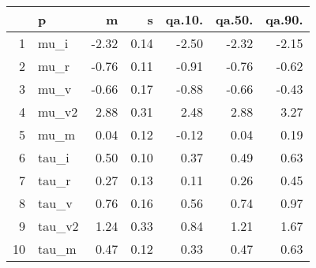 \begin{table}[ht]
\centering
\begin{tabular}{rlrrrrr}
  \hline
 & p & m & s & qa.10. & qa.50. & qa.90. \\ 
  \hline
1 & mu\_i & -2.32 & 0.14 & -2.50 & -2.32 & -2.15 \\ 
  2 & mu\_r & -0.76 & 0.11 & -0.91 & -0.76 & -0.62 \\ 
  3 & mu\_v & -0.66 & 0.17 & -0.88 & -0.66 & -0.43 \\ 
  4 & mu\_v2 & 2.88 & 0.31 & 2.48 & 2.88 & 3.27 \\ 
  5 & mu\_m & 0.04 & 0.12 & -0.12 & 0.04 & 0.19 \\ 
  6 & tau\_i & 0.50 & 0.10 & 0.37 & 0.49 & 0.63 \\ 
  7 & tau\_r & 0.27 & 0.13 & 0.11 & 0.26 & 0.45 \\ 
  8 & tau\_v & 0.76 & 0.16 & 0.56 & 0.74 & 0.97 \\ 
  9 & tau\_v2 & 1.24 & 0.33 & 0.84 & 1.21 & 1.67 \\ 
  10 & tau\_m & 0.47 & 0.12 & 0.33 & 0.47 & 0.63 \\ 
   \hline
\end{tabular}
\label{tab:param}
\end{table}
